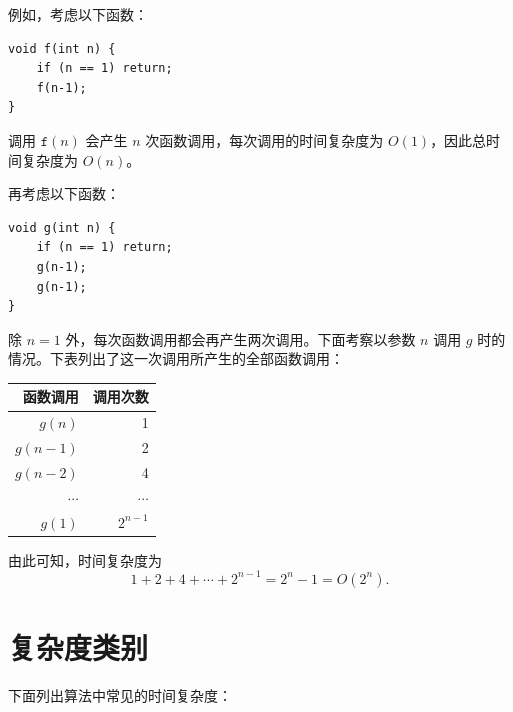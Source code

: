 例如，考虑以下函数：
\begin{lstlisting}
void f(int n) {
    if (n == 1) return;
    f(n-1);
}
\end{lstlisting}
调用 $\texttt{f}(n)$ 会产生 $n$ 次函数调用，每次调用的时间复杂度为 $O(1)$，因此总时间复杂度为 $O(n)$。

再考虑以下函数：
\begin{lstlisting}
void g(int n) {
    if (n == 1) return;
    g(n-1);
    g(n-1);
}
\end{lstlisting}
除 $n=1$ 外，每次函数调用都会再产生两次调用。下面考察以参数 $n$ 调用 $g$ 时的情况。下表列出了这一次调用所产生的全部函数调用：
\begin{center}
\begin{tabular}{rr}
函数调用 & 调用次数 \\
\hline
$g(n)$ & 1 \\
$g(n-1)$ & 2 \\
$g(n-2)$ & 4 \\
$\cdots$ & $\cdots$ \\
$g(1)$ & $2^{n-1}$ \\
\end{tabular}
\end{center}
由此可知，时间复杂度为
\[1+2+4+\cdots+2^{n-1} = 2^n-1 = O(2^n).\]

\section{复杂度类别}


下面列出算法中常见的时间复杂度：

